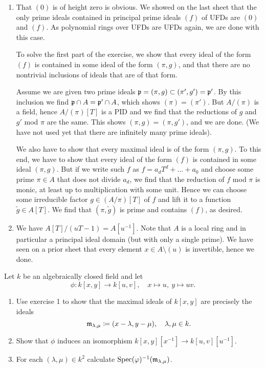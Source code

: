 \documentclass[a4paper,11pt]{article}
\begin{document}
\begin{enumerate}
    \item That $(0)$ is of height zero is obvious. We showed on the last sheet
        that the only prime ideals contained in principal prime ideals 
        $(f)$ of UFDs are $(0)$ and $(f)$. As polynomial rings over UFDs are 
        UFDs again, we are done with this case. 

        To solve the first part of the exercise, we show that every ideal of the
        form $(f)$ is contained in some ideal of the form $(\pi, g)$, and that
        there are no nontrivial inclusions of ideals that are of that form.

        Assume we are given two prime ideals $ \mathfrak{p} = (\pi, g) \subset (\pi',
        g') = \mathfrak{p}'$. By this inclusion we find $\mathfrak{p} \cap A = \mathfrak{p}' \cap A$, 
        which shows $(\pi) = (\pi')$. But 
        $A/(\pi)$ is a field, hence $A/(\pi)[T]$ is a PID and we find that 
        the reductions of $g$ and $g'$ mod $\pi$ are the same. This shows 
        $(\pi, g) = (\pi, g')$, and we are done. (We have not used yet that 
        there are infinitely many prime ideals).

        We also have to show that every maximal ideal is of the form $(\pi, g)$. 
        To this end, we have to show that every ideal of the form $(f)$ is
        contained in some ideal $(\pi, g)$. But if we write such $f$ 
        as $f = a_d T^d + \dots + a_0$ and choose some prime $\pi \in A$ 
        that does not divide $a_d$, we find that the reduction of $f$ mod $\pi$
        is monic, at least up to multiplication with some unit. Hence we can 
        choose some irreducible factor $g \in (A/\pi)[T]$ of $f$ and lift
        it to a function $\tilde g \in A[T]$. We find that $(\pi, \tilde g)$ 
        is prime and contains $(f)$, as desired. 
        
    \item We have $A[T]/(uT-1) = A[u^{-1}]$. Note that $A$ is a local ring and in
        particular a principal ideal domain (but with only a single prime). 
        We have seen on a prior sheet that every element $x \in A \setminus (u)$
        is invertible, hence we done. 
\end{enumerate}


Let $k$ be an algebraically closed field and let 
\begin{equation*}
    \phi: k[x,y] \to k[u,v], \quad x \mapsto u, \ y \mapsto uv.
\end{equation*}
\begin{enumerate}
    \item Use exercise 1 to show that the maximal ideals of $k[x,y]$ are precisely
        the ideals 
        \begin{equation*}
            \mathfrak{m}_{\lambda, \mu} \coloneqq (x-\lambda, y - \mu), \quad \lambda,
            \mu \in k.
        \end{equation*}
    \item Show that $\phi$ induces an isomorphism $k[x,y][x^{-1}] \to
        k[u,v][u^{-1}]$. 
    \item For each $(\lambda, \mu) \in k^2$ calculate
        $\operatorname{Spec}(\varphi)^{-1}(\mathfrak{m}_{\lambda, \mu})$. 
\end{enumerate}
\end{document}
